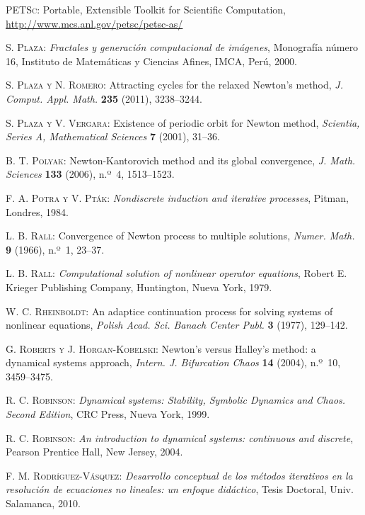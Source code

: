 \begin{thebibliography}{999}
\textsc{PETSc}:
Portable, Extensible Toolkit for Scientific Computation,
\url{http://www.mcs.anl.gov/petsc/petsc-as/}

\textsc{S. Plaza}:
\textit{Fractales y generación computacional de imágenes},
Monografía número 16,  Instituto de Matemáticas y Ciencias Afines, IMCA, Perú, 2000.

\textsc{S. Plaza y N. Romero}:
Attracting cycles for the relaxed Newton's method,
\textit{J. Comput. Appl. Math.} \textbf{235} (2011), 3238--3244.

\textsc{S. Plaza y V. Vergara}:
Existence of periodic orbit for Newton method,
\textit{Scientia, Series A, Mathematical Sciences} \textbf{7} (2001), 31--36.


\textsc{B. T. Polyak}:
 Newton-Kantorovich method and its global convergence,
\textit{J. Math. Sciences} \textbf{133} (2006), n.º~4, 1513--1523.

\textsc{F. A. Potra y V. Pták}:
\textit{Nondiscrete induction and iterative processes},
 Pitman, Londres, 1984.

\textsc{L. B. Rall}:
{Convergence of Newton process to multiple solutions},
 \textit{Numer. Math.} \textbf{9} (1966), n.º~1, 23--37.
 
\textsc{L. B. Rall}:
\textit{Computational solution of nonlinear operator equations},
Robert E. Krieger Publishing Company, Huntington, Nueva York, 1979.

\textsc{W. C. Rheinboldt}:
{An adaptice continuation process for solving systems of nonlinear equations},
\textit{Polish Acad. Sci. Banach Center Publ.} \textbf{3} (1977), 129--142.

\textsc{G. Roberts y J. Horgan-Kobelski}:
Newton's versus Halley's method: a dynamical systems approach,
\textit{Intern. J. Bifurcation Chaos} \textbf{14} (2004), n.º~10, 3459--3475.

\textsc{R. C. Robinson}:
 \textit{Dynamical systems: Stability, Symbolic Dynamics and Chaos. Second Edition},
CRC Press, Nueva York, 1999.

\textsc{R. C. Robinson}:
\textit{An introduction to dynamical systems: continuous and discrete},
Pearson Prentice Hall, New Jersey, 2004.


\textsc{F. M. Rodríguez-Vásquez}:
 \textit{Desarrollo conceptual de los métodos iterativos en la resolución de ecuaciones no lineales: un enfoque didáctico},
Tesis Doctoral, Univ. Salamanca, 2010.
 

\end{thebibliography}

